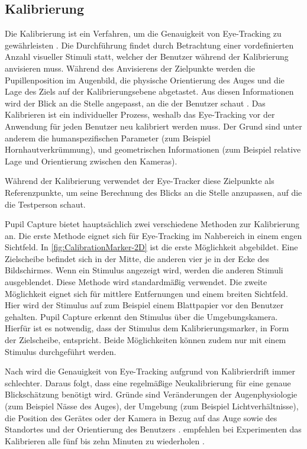 \subsection{Kalibrierung}
Die Kalibrierung ist ein Verfahren, um die Genauigkeit von Eye-Tracking zu gewährleisten \cite{Clay_Koenig_Koenig_2019}. Die Durchführung findet durch Betrachtung einer vordefinierten Anzahl visueller Stimuli statt, welcher der Benutzer während der Kalibrierung anvisieren muss. Während des Anvisierens der Zielpunkte werden die Pupillenposition im Augenbild, die physische Orientierung des Auges und die Lage des Ziels auf der Kalibrierungsebene abgetastet. \cite{Lander.2018} Aus diesen Informationen wird der Blick an die Stelle angepasst, an die der Benutzer schaut \cite{Clay_Koenig_Koenig_2019}. Das Kalibrieren ist ein individueller Prozess, weshalb das Eye-Tracking vor der Anwendung für jeden Benutzer neu kalibriert werden muss. Der Grund sind unter anderem die humanspezifischen Parameter (zum Beispiel Hornhautverkrümmung), und geometrischen Informationen (zum Beispiel relative Lage und Orientierung zwischen den Kameras). \cite{Lander.2018}

Während der Kalibrierung verwendet der Eye-Tracker diese Zielpunkte als Referenzpunkte, um seine Berechnung des Blicks an die Stelle anzupassen, auf die die Testperson schaut. 

Pupil Capture bietet hauptsächlich zwei verschiedene Methoden zur Kalibrierung an. Die erste Methode eignet sich für Eye-Tracking im Nahbereich in einem engen Sichtfeld. In \autoref{fig:CalibrationMarker-2D} ist die erste Möglichkeit abgebildet. Eine Zielscheibe befindet sich in der Mitte, die anderen vier je in der Ecke des Bildschirmes. Wenn ein Stimulus angezeigt wird, werden die anderen Stimuli ausgeblendet. Diese Methode wird standardmäßig verwendet. Die zweite Möglichkeit eignet sich für mittlere Entfernungen und einem breiten Sichtfeld. Hier wird der Stimulus auf zum Beispiel einem Blattpapier vor den Benutzer gehalten. Pupil Capture erkennt den Stimulus über die Umgebungskamera. Hierfür ist es notwendig, dass der Stimulus dem Kalibrierungsmarker, in Form der Zielscheibe, entspricht. Beide Möglichkeiten können zudem nur mit einem Stimulus durchgeführt werden. \cite{PupilLabsCalib}

Nach \citeauthor{Lander.2018} wird die Genauigkeit von Eye-Tracking aufgrund von Kalibrierdrift immer schlechter. Daraus folgt, dass eine regelmäßige Neukalibrierung für eine genaue Blickschätzung benötigt wird. \cite{Lander.2018} Gründe sind Veränderungen der Augenphysiologie (zum Beispiel Nässe des Auges), der Umgebung (zum Beispiel Lichtverhältnisse), die Position des Gerätes oder der Kamera in Bezug auf das Auge sowie des Standortes und der Orientierung des Benutzers \cite{Cerrolaza.2012}. \citeauthor{Clay_Koenig_Koenig_2019} empfehlen bei Experimenten das Kalibrieren alle fünf bis zehn Minuten zu wiederholen \cite{Clay_Koenig_Koenig_2019}. 

